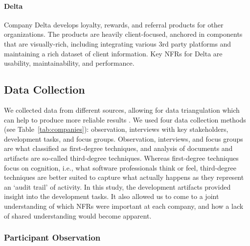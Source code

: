 \documentclass[smallextended]{svjour3}
\begin{document}
\paragraph{Delta}
Company Delta develops loyalty, rewards, and referral products for other organizations. The products are heavily client-focused, anchored in components that are visually-rich, including integrating various 3rd party platforms and maintaining a rich dataset of client information. Key NFRs for Delta are usability, maintainability, and performance. 

\subsection{Data Collection}

We collected data from different sources, allowing for data triangulation which can help to produce more reliable results \citep{lethbridge2005studying,yin_case_2002}. 
We used four data collection methods (see Table~\ref{tab:companies}): observation, interviews with key stakeholders, development tasks, and focus groups. Observation, interviews, and focus groups are what \cite{lethbridge2005studying} classified as first-degree techniques, and analysis of documents and artifacts are so-called third-degree techniques. Whereas first-degree techniques focus on cognition, i.e., what software professionals think or feel, third-degree techniques are better suited to capture what actually happens as they represent an `audit trail' of activity. In this study, the development artifacts provided insight into the development tasks. It also allowed us to come to a joint understanding of which NFRs were important at each company, and how a lack of shared understanding would become apparent.




\subsubsection{Participant Observation}
\label{immersive_visits}
\end{document}
